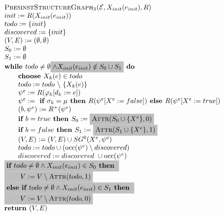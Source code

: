 \documentclass{article}
\begin{document}
\begin{equation*}
\begin{array}{l}
\textsc{PbesinstStructureGraph$_{3}$(}\mathcal{E}, X_{init}(e_{init}), R) \\ 
init:=R(X_{init}(e_{init})) \\
todo:=\{init\} \\
discovered:=\{init\} \\
(V,E) :=(\emptyset ,\emptyset ) \\ 
S_0:= \emptyset \\
S_1:= \emptyset \\
\textbf{while }todo\neq \emptyset%
\colorbox{lightgray}{$%
\wedge X_{init}(e_{init}) \notin S_0 \cup S_1 $}%
\textbf{ do} \\ 
\qquad \text{\textbf{choose }}X_{k}(e)\in todo \\ 
\qquad todo:=todo\ \backslash \ \{X_{k}(e)\} \\ 
\qquad \psi ^{e}:=R(\varphi _{k}[d_{k}:=e]) \\ 
\qquad \psi^e := \textbf{ if } \sigma_k = \mu \textbf{ then } R(\psi^e[X^e := false])
\textbf{ else }  R(\psi^e[X^e := true]) \\
\qquad (b,\psi^e) := R^+(\psi^e) \\
\qquad \textbf{if $b = true$ then } S_0 := \colorbox{lightgray}{$%
\textsc{Attr}(S_0 \cup \{ X^e \}, 0) $}\\
\qquad \textbf{if $b = false$ then } S_1 := \colorbox{lightgray}{$%
\textsc{Attr}(S_1 \cup \{ X^e \}, 1) $}\\
\qquad (V,E) := (V,E) \cup SG^{0}(X^{e},\psi ^{e}) \\ 
\qquad todo:=todo\cup (\mathrm{occ}(\psi ^{e})\setminus discovered) \\
\qquad discovered:=discovered\ \cup \mathrm{occ}(\psi ^{e}) \\
\colorbox{lightgray}{$
\textbf{if } todo \neq \emptyset \land X_{init}(e_{init}) \in S_0 \textbf{ then }
$}\\
\colorbox{lightgray}{$
\qquad V := V \setminus \textsc{Attr}(todo, 1)
$}\\
\colorbox{lightgray}{$
\textbf{else if } todo \neq \emptyset \land X_{init}(e_{init}) \in S_1 \textbf{ then }
$}\\
\colorbox{lightgray}{$
\qquad V := V \setminus \textsc{Attr}(todo, 0)
$}\\
\textbf{return }(V, E)
\end{array}%
\end{equation*}%
\end{document}

